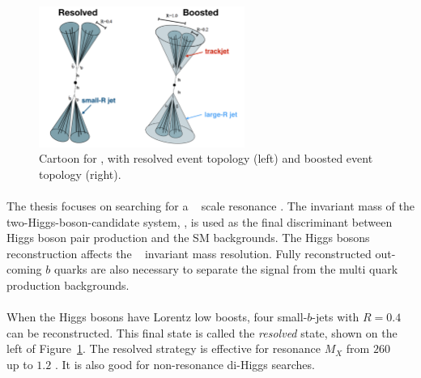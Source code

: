 \begin{figure}[htbp!]
  \centering
  \includegraphics[width=0.6\textwidth]{figures/theory/resolved_boosted}
  \caption{Cartoon for \Xtohhb, with resolved event topology (left) and boosted event topology (right).}
  \label{fig:resolved_bosted}
\end{figure}

\paragraph{}
The thesis focuses on searching for a \TeV~ scale resonance \Xtohhb. 
The invariant mass of the two-Higgs-boson-candidate system, \mtwoJ, is used as the final discriminant between Higgs boson pair production and the SM backgrounds.
The Higgs bosons reconstruction affects the \mtwoJ~ invariant mass resolution.
Fully reconstructed out-coming $b$ quarks are also necessary to separate the signal from the multi quark production backgrounds.

\paragraph{}
When the Higgs bosons have Lorentz low boosts, four small-\R $b$-jets with $R=0.4$ can be reconstructed.
This final state is called the \textit{resolved} state, shown on the left of Figure~\ref{fig:resolved_bosted}.
The resolved strategy is effective for resonance $M_X$ from $260$ \GeV~ up to $1.2$ \TeV.
It is also good for non-resonance di-Higgs searches.

